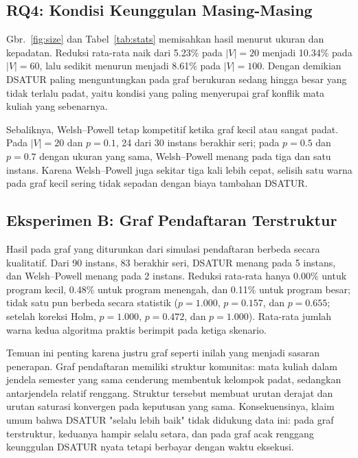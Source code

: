 \documentclass[conference,a4paper]{IEEEtran}
\begin{document}
\subsection{RQ4: Kondisi Keunggulan Masing-Masing}
Gbr.~\ref{fig:size} dan Tabel~\ref{tab:stats} memisahkan hasil menurut
ukuran dan kepadatan. Reduksi rata-rata naik dari 5.23\% pada $|V|=20$ menjadi
10.34\% pada $|V|=60$, lalu sedikit menurun menjadi 8.61\% pada $|V|=100$.
Dengan demikian DSATUR paling menguntungkan pada graf berukuran sedang hingga
besar yang tidak terlalu padat, yaitu kondisi yang paling menyerupai graf
konflik mata kuliah yang sebenarnya.



Sebaliknya, Welsh--Powell tetap kompetitif ketika graf kecil atau sangat padat.
Pada $|V|=20$ dan $p=0.1$, 24 dari 30 instans berakhir seri; pada $p=0.5$ dan
$p=0.7$ dengan ukuran yang sama, Welsh--Powell menang pada tiga dan satu
instans. Karena Welsh--Powell juga sekitar tiga kali lebih cepat, selisih satu
warna pada graf kecil sering tidak sepadan dengan biaya tambahan DSATUR.

\subsection{Eksperimen B: Graf Pendaftaran Terstruktur}
Hasil pada graf yang diturunkan dari simulasi pendaftaran berbeda secara
kualitatif. Dari 90 instans, 83 berakhir seri, DSATUR menang pada 5 instans,
dan Welsh--Powell menang pada 2 instans. Reduksi
rata-rata hanya 0.00\% untuk program kecil, 0.48\% untuk program menengah, dan
0.11\% untuk program besar; tidak satu pun berbeda secara statistik
($p=1.000$, $p=0.157$, dan $p=0.655$; setelah koreksi Holm, $p=1.000$,
$p=0.472$, dan $p=1.000$). Rata-rata jumlah warna kedua algoritma praktis
berimpit pada ketiga skenario.

Temuan ini penting karena justru graf seperti inilah yang menjadi sasaran
penerapan. Graf pendaftaran memiliki struktur komunitas: mata kuliah dalam
jendela semester yang sama cenderung membentuk kelompok padat, sedangkan
antarjendela relatif renggang. Struktur tersebut membuat urutan derajat dan
urutan saturasi konvergen pada keputusan yang sama. Konsekuensinya, klaim umum
bahwa DSATUR "selalu lebih baik" tidak didukung data ini: pada graf
terstruktur, keduanya hampir selalu setara, dan pada graf acak renggang
keunggulan DSATUR nyata tetapi berbayar dengan waktu eksekusi.
\end{document}
